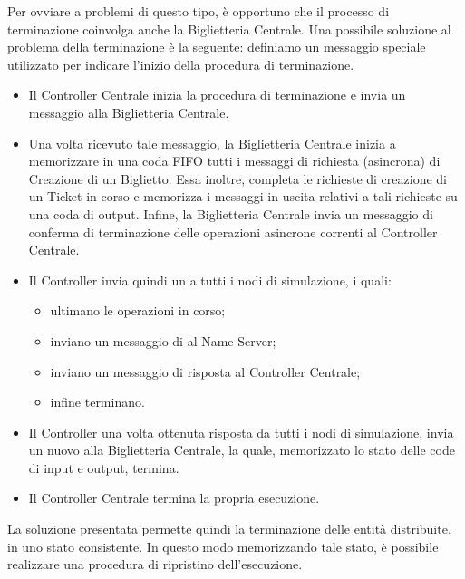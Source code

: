 	Per ovviare a problemi di questo tipo, è opportuno che il processo di terminazione coinvolga anche la Biglietteria Centrale. Una possibile soluzione al problema della terminazione è la seguente: definiamo  un messaggio speciale utilizzato per indicare l'inizio della procedura di terminazione. 
	\begin{itemize}
		\item Il Controller Centrale inizia la procedura di terminazione e invia un messaggio  alla Biglietteria Centrale.
		\item Una volta ricevuto tale messaggio, la Biglietteria Centrale inizia a memorizzare in una coda FIFO tutti i messaggi di richiesta (asincrona) di Creazione di un Biglietto. Essa inoltre, completa le richieste di creazione di un Ticket in corso e memorizza i messaggi in uscita relativi a tali richieste su una coda di output.
		Infine, la Biglietteria Centrale invia un messaggio di conferma di terminazione delle operazioni asincrone correnti al Controller Centrale.
		\item Il Controller invia quindi un  a tutti i nodi di simulazione, i quali:
			\begin{itemize}
				\item ultimano le operazioni in corso;
				\item inviano un messaggio di  al Name Server;
				\item inviano un messaggio di risposta al Controller Centrale;
				\item infine terminano.
			\end{itemize}
		\item Il Controller una volta ottenuta risposta da tutti i nodi di simulazione, invia un nuovo  alla Biglietteria Centrale, la quale, memorizzato lo stato delle code di input e output, termina.
		\item Il Controller Centrale termina la propria esecuzione.
	\end{itemize}
	
	La soluzione presentata permette quindi la terminazione delle entità distribuite, in uno stato consistente. In questo modo memorizzando tale stato, è possibile realizzare una procedura di ripristino dell'esecuzione. 
